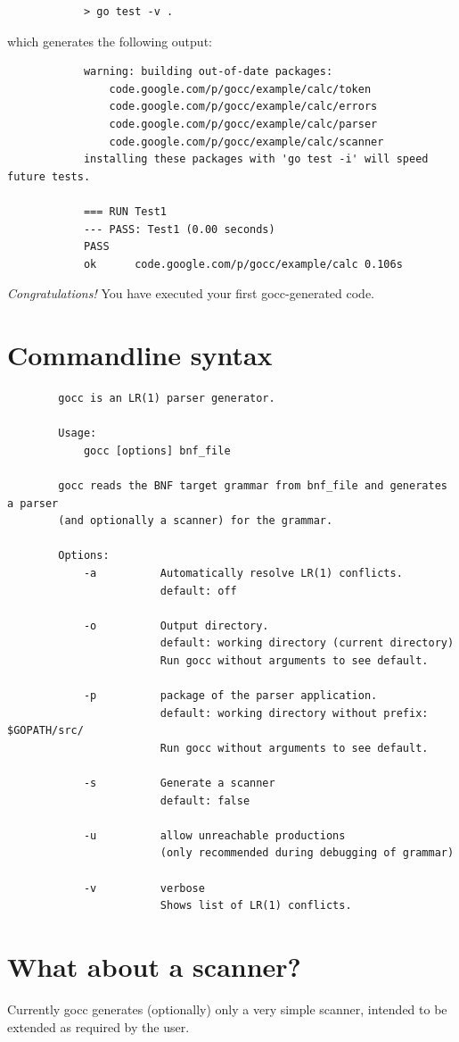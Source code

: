 \documentclass[12pt]{article}
\begin{document}
		\begin{verbatim}
			> go test -v .
		\end{verbatim}

		which generates the following output:

		\begin{verbatim}
			warning: building out-of-date packages:
			    code.google.com/p/gocc/example/calc/token
			    code.google.com/p/gocc/example/calc/errors
			    code.google.com/p/gocc/example/calc/parser
			    code.google.com/p/gocc/example/calc/scanner
			installing these packages with 'go test -i' will speed future tests.

			=== RUN Test1
			--- PASS: Test1 (0.00 seconds)
			PASS
			ok  	code.google.com/p/gocc/example/calc	0.106s		\end{verbatim}

		{\em Congratulations!} You have executed your first gocc-generated code.

\section{Commandline syntax}\label{sec:commandline}
	\begin{verbatim}
		gocc is an LR(1) parser generator.

		Usage:
		    gocc [options] bnf_file

		gocc reads the BNF target grammar from bnf_file and generates a parser 
		(and optionally a scanner) for the grammar.

		Options:
		    -a          Automatically resolve LR(1) conflicts.
		                default: off

		    -o          Output directory.
		                default: working directory (current directory)
		                Run gocc without arguments to see default.

		    -p          package of the parser application.
		                default: working directory without prefix: $GOPATH/src/
		                Run gocc without arguments to see default.

		    -s          Generate a scanner
		                default: false

		    -u          allow unreachable productions 
		                (only recommended during debugging of grammar)

		    -v          verbose
		                Shows list of LR(1) conflicts.
	\end{verbatim}

\section{What about a scanner?}\label{sec:scanner}
	Currently gocc generates (optionally) only a very simple scanner, intended to be extended as required by the user.
\end{document}

